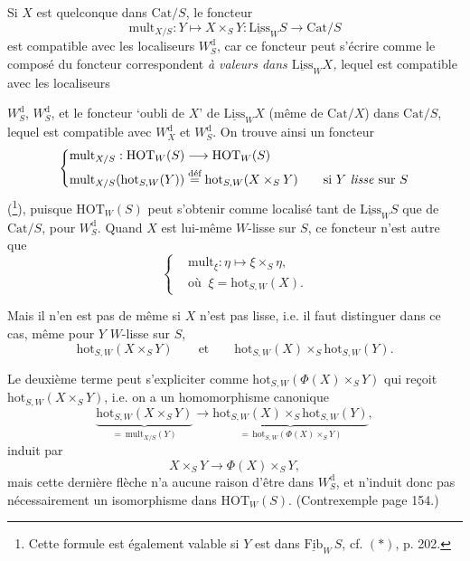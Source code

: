 \documentclass[11pt]{article}
\newcommand{\printedpage}[1]{\marginpar{\footnotesize p.~#1}}
\newcommand{\msp}[1]{\marginpar{\footnotesize [#1]}}
\newcommand{\und}[1]{\underline{\mathrm{#1}}}
\begin{document}
Si $X$ est quelconque dans $\mathrm{Cat}/S$, le foncteur
\[
\mathrm{mult}_{X/S} : Y \longmapsto X \times_S Y : \und{Liss}_W S \longrightarrow \mathrm{Cat}/S
\]
est compatible avec les localiseurs $W_S^{\mathrm{d}}$, car ce foncteur peut s'écrire comme le composé du foncteur correspondent \textit{à valeurs dans $\und{Liss}_W X$,} lequel est compatible avec les localiseurs %

\setcounter{footnote}{97}

\printedpage{124}

$W_S^{\mathrm{d}}$, $W_S^{\mathrm{d}}$, et le foncteur ‘oubli de $X$’ de $\underline{\mathrm{Liss}}_W X$ (même de $\mathrm{Cat}/X$) dans $\mathrm{Cat}/S$, lequel est compatible avec $W_X^{\mathrm{d}}$ et $W_S^{\mathrm{d}}$. On trouve ainsi un foncteur %
\[
\left\{\begin{aligned}
&\mathrm{mult}_{X/S} : \mathrm{HOT}_W(S) \longrightarrow \mathrm{HOT}_W(S)\\
&\mathrm{mult}_{X/S}(\mathrm{hot}_{S,W}(Y)) \overset{\text{déf}}{=} \mathrm{hot}_{S,W}(X\times_S Y) \qquad \text{si $Y$ \textit{lisse} sur $S$}
\end{aligned}\right.
\]
(\footnote{Cette formule est également valable si $Y$ est dans $\underline{\mathrm{Fib}}_W\, S$, cf. $(*)$, p. 202.}), puisque $\mathrm{HOT}_W(S)$ peut s'obtenir comme localisé tant de $\underline{\mathrm{Liss}}_W S$ que de $\mathrm{Cat}/S$, pour $W_S^{\mathrm{d}}$. Quand $X$ est lui-même $W$-lisse sur $S$, ce foncteur n'est autre que
\[
\left\{\begin{aligned}
&\mathrm{mult}_\xi : \eta \longmapsto \xi\times_S \eta,\\
&\text{où }\ \xi = \mathrm{hot}_{S,W}(X).
\end{aligned}\right.
\]

Mais il n'en est pas de même si $X$ n'est pas lisse, i.e. il faut distinguer dans ce cas, même pour $Y$ $W$-lisse sur $S$,
\[
\mathrm{hot}_{S,W}(X\times_S Y) \qquad\text{et}\qquad \mathrm{hot}_{S,W}(X)\times_S \mathrm{hot}_{S,W}(Y).
\]

Le deuxième terme peut s'expliciter comme $\mathrm{hot}_{S,W}(\Phi(X)\times_S Y)$ qui reçoit $\mathrm{hot}_{S,W}(X\times_S Y)$, i.e.
\msp{page 201}
on a un homomorphisme canonique
\[
\underbrace{\mathrm{hot}_{S,W}(X\times_S Y)}_{=\,\mathrm{mult}_{X/S}(Y)} \longrightarrow \underbrace{\mathrm{hot}_{S,W}(X)\times_S \mathrm{hot}_{S,W}(Y)}_{=\,\mathrm{hot}_{S,W}(\Phi(X)\times_S Y)},
\]
induit par
\[
X\times_S Y \longrightarrow \Phi(X)\times_S Y,
\]
mais cette dernière flèche n'a aucune raison d'être dans $W_S^{\mathrm{d}}$, et n'induit donc pas nécessairement un isomorphisme dans $\mathrm{HOT}_W(S)$. (Contrexemple page 154.)
\end{document}
